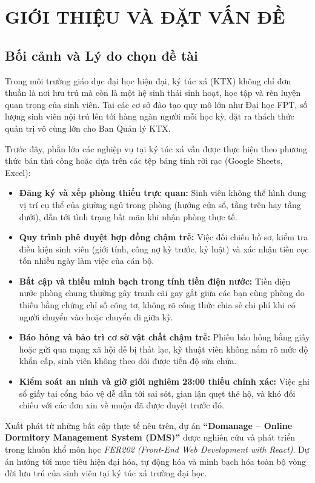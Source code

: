 \chapter{GIỚI THIỆU VÀ ĐẶT VẤN ĐỀ}
\label{ch:introduction}

\section{Bối cảnh và Lý do chọn đề tài}
Trong môi trường giáo dục đại học hiện đại, ký túc xá (KTX) không chỉ đơn thuần là nơi lưu trú mà còn là một hệ sinh thái sinh hoạt, học tập và rèn luyện quan trọng của sinh viên. Tại các cơ sở đào tạo quy mô lớn như Đại học FPT, số lượng sinh viên nội trú lên tới hàng ngàn người mỗi học kỳ, đặt ra thách thức quản trị vô cùng lớn cho Ban Quản lý KTX.

Trước đây, phần lớn các nghiệp vụ tại ký túc xá vẫn được thực hiện theo phương thức bán thủ công hoặc dựa trên các tệp bảng tính rời rạc (Google Sheets, Excel):
\begin{itemize}
    \item \textbf{Đăng ký và xếp phòng thiếu trực quan:} Sinh viên không thể hình dung vị trí cụ thể của giường ngủ trong phòng (hướng cửa sổ, tầng trên hay tầng dưới), dẫn tới tình trạng bất mãn khi nhận phòng thực tế.
    \item \textbf{Quy trình phê duyệt hợp đồng chậm trễ:} Việc đối chiếu hồ sơ, kiểm tra điều kiện sinh viên (giới tính, công nợ kỳ trước, kỷ luật) và xác nhận tiền cọc tốn nhiều ngày làm việc của cán bộ.
    \item \textbf{Bất cập và thiếu minh bạch trong tính tiền điện nước:} Tiền điện nước phòng chung thường gây tranh cãi gay gắt giữa các bạn cùng phòng do thiếu bằng chứng chỉ số công tơ, không rõ công thức chia sẻ chi phí khi có người chuyển vào hoặc chuyển đi giữa kỳ.
    \item \textbf{Báo hỏng và bảo trì cơ sở vật chất chậm trễ:} Phiếu báo hỏng bằng giấy hoặc gửi qua mạng xã hội dễ bị thất lạc, kỹ thuật viên không nắm rõ mức độ khẩn cấp, sinh viên không theo dõi được tiến độ sửa chữa.
    \item \textbf{Kiểm soát an ninh và giờ giới nghiêm 23:00 thiếu chính xác:} Việc ghi sổ giấy tại cổng bảo vệ dễ dẫn tới sai sót, gian lận quẹt thẻ hộ, và khó đối chiếu với các đơn xin về muộn đã được duyệt trước đó.
\end{itemize}

Xuất phát từ những bất cập thực tế nêu trên, dự án \textbf{``Domanage -- Online Dormitory Management System (DMS)''} được nghiên cứu và phát triển trong khuôn khổ môn học \textit{FER202 (Front-End Web Development with React)}. Dự án hướng tới mục tiêu hiện đại hóa, tự động hóa và minh bạch hóa toàn bộ vòng đời lưu trú của sinh viên tại ký túc xá trường đại học.

